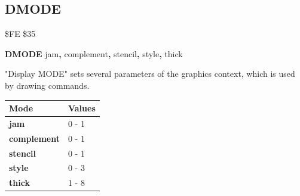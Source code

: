 
\newpage
\subsection{DMODE}
\begin{description}[leftmargin=2cm,style=nextline]
\item [Token:] \$FE \$35
\item [Format:] {\bf DMODE} jam{\bf,} complement{\bf,}
		stencil{\bf,} style{\bf,} thick
\item [Usage:]
   "Display MODE" sets several parameters of the graphics context, which is used by drawing commands.

\begin{center}
\begin{tabular}{|l|l|}
\hline
   {\bf Mode} & {\bf Values}\\
\hline
   {\bf jam}        &  0 - 1 \\
   {\bf complement} &  0 - 1 \\
   {\bf stencil}    &  0 - 1 \\
   {\bf style}      &  0 - 3 \\
   {\bf thick}      &  1 - 8 \\
\hline
\end{tabular}
\end{center}
\end{description}


\newpage
